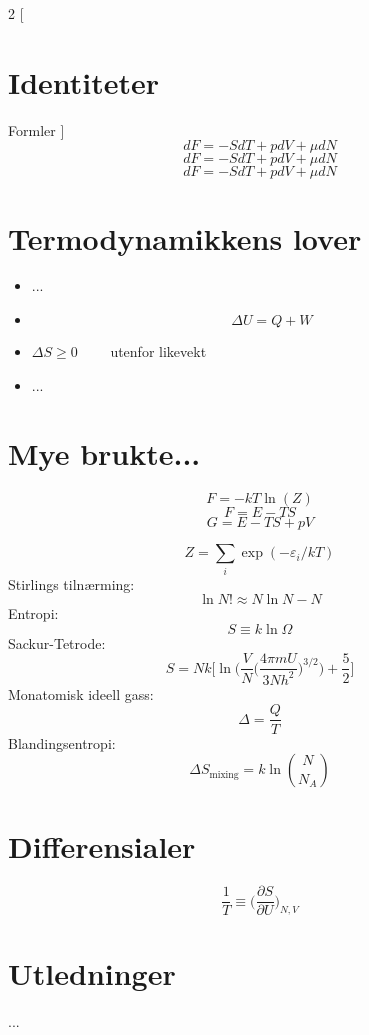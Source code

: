 \documentclass{article}
\begin{document}
\begin{multicols}{2}
[
\section{Identiteter}
Formler
]
$$dF=-SdT+pdV+\mu dN$$
$$dF=-SdT+pdV+\mu dN$$
$$dF=-SdT+pdV+\mu dN$$

\section{Termodynamikkens lover}
\begin{itemize}
\item ...
\item $$\Delta U=Q+W$$
\item $\Delta S\ge 0 \qquad$ utenfor likevekt
\item ...
\end{itemize}

\section{Mye brukte...}
$$F=-kT\ln(Z)$$
$$F=E-TS$$
$$G=E-TS+pV$$

$$Z=\sum_i\exp(-\varepsilon_i/kT)$$
Stirlings tiln{\ae}rming:
$$\ln N! \approx N\ln N - N$$
Entropi:
$$S\equiv k\ln\Omega$$
Sackur-Tetrode:
$$S=Nk\Bigg[\ln\Bigg(\frac{V}{N}\bigg(\frac{4\pi mU}{3Nh^2}\bigg)^{3/2}\Bigg)+\frac{5}{2}\Bigg]$$
Monatomisk ideell gass:
$$\Delta =\frac{Q}{T}$$
Blandingsentropi:
$$\Delta S_{\text{mixing}}=k\ln\binom{N}{N_A}$$

\section{Differensialer}
$$\frac{1}{T}\equiv\bigg(\frac{\partial S}{\partial U}\bigg)_{N,V}$$

\section{Utledninger}
...

\end{multicols}

 
\end{document}
